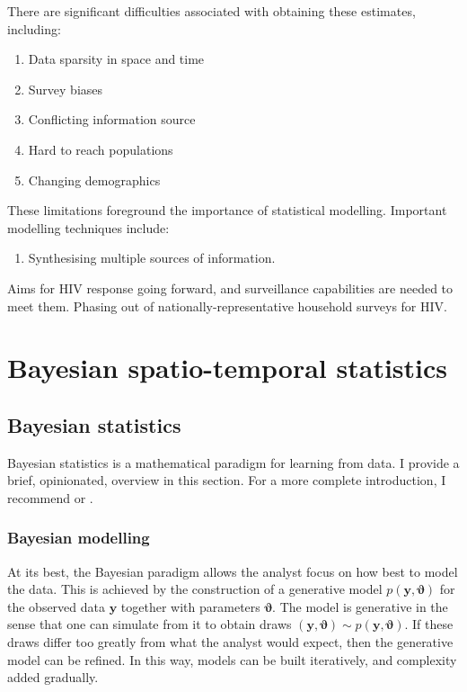 \documentclass[a4paper, nobind]{templates/ociamthesis}
\providecommand{\tightlist}{%
  \setlength{\itemsep}{0pt}\setlength{\parskip}{0pt}}
\newcommand{\y}{\mathbf{y}}
\newcommand{\bvartheta}{\bm{\vartheta}}
\begin{document}
There are significant difficulties associated with obtaining these estimates, including:

\begin{enumerate}
\def\labelenumi{\arabic{enumi}.}
\tightlist
\item
  Data sparsity in space and time
\item
  Survey biases
\item
  Conflicting information source
\item
  Hard to reach populations
\item
  Changing demographics
\end{enumerate}

These limitations foreground the importance of statistical modelling.
Important modelling techniques include:

\begin{enumerate}
\def\labelenumi{\arabic{enumi}.}
\tightlist
\item
  Synthesising multiple sources of information.
\end{enumerate}

Aims for HIV response going forward, and surveillance capabilities are needed to meet them.
Phasing out of nationally-representative household surveys for HIV.

\hypertarget{bayes-st}{%
\chapter{Bayesian spatio-temporal statistics}\label{bayes-st}}

\adjustmtc
{}

\hypertarget{bayesian-statistics}{%
\section{Bayesian statistics}\label{bayesian-statistics}}

Bayesian statistics is a mathematical paradigm for learning from data.
I provide a brief, opinionated, overview in this section.
For a more complete introduction, I recommend \textcite{mcelreath2020statistical} or \textcite{gelman2013bayesian}.

\hypertarget{bayesian-modelling}{%
\subsection{Bayesian modelling}\label{bayesian-modelling}}

At its best, the Bayesian paradigm allows the analyst focus on how best to model the data.
This is achieved by the construction of a generative model \(p(\y, \bvartheta)\) for the observed data \(\y\) together with parameters \(\bvartheta\).
The model is generative in the sense that one can simulate from it to obtain draws \((\y, \bvartheta) \sim p(\y, \bvartheta)\).
If these draws differ too greatly from what the analyst would expect, then the generative model can be refined.
In this way, models can be built iteratively, and complexity added gradually.
\end{document}
